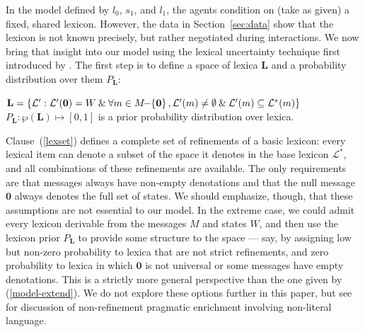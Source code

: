 \documentclass[12pt,twoside]{article}
\newcommand{\secref}[1]{Section~\ref{#1}}
\newcommand{\eg}[1]{(\ref{#1})}
\newcommand{\subeg}[2]{(\ref{#2})}
\newcommand{\set}[1]{\ensuremath{\left\{ #1 \right\}}}
\newcommand{\States}{W}
\newcommand{\Lex}{\mathcal{L}}
\newcommand{\LexStar}{\Lex^{\ast}}
\newcommand{\LexSet}{\mathbf{L}}
\newcommand{\Messages}{M}
\newcommand{\msg}{m}
\newcommand{\LexPrior}{P_{\LexSet}}
\newcommand{\listenerZero}{l_{0}}
\newcommand{\speakerOne}{s_{1}}
\newcommand{\listenerOne}{l_{1}}
\newcommand{\nullmsg}{\mathbf{0}}
\renewcommand{\_}{\textbf{\textunderscore\hspace{-4pt}\textunderscore\hspace{-3pt}\textunderscore\hspace{-4pt}\textunderscore}\hspace{0.5pt}}			%
\begin{document}
In the model defined by $\listenerZero$, $\speakerOne$, and
$\listenerOne$, the agents condition on (take as given) a fixed,
shared lexicon. However, the data in \secref{sec:data} show that the
lexicon is not known precisely, but rather negotiated during
interactions. We now bring that insight into our model using the
lexical uncertainty technique first introduced by
\citet{Bergen:Goodman:Levy:2012,bergen-levy-goodman:2014}. The first
step is to define a space of lexica $\LexSet$ and a probability
distribution over them $\LexPrior$:
%
\begin{exe}
\ex\label{model-extend}
  \begin{xlist} 
  \ex\label{lexset}%
      $\LexSet = 
      \set{\Lex' : 
        \Lex'(\nullmsg) = \States \mathbin{\&}
        \forall \msg \in \Messages{\negthinspace-\negthinspace}\set{\nullmsg}, 
        \Lex'(\msg) \neq \emptyset \mathbin{\&}
        \Lex'(\msg) \subseteq \LexStar(\msg)}$
  \ex\label{LexPrior}%
    $\LexPrior : \wp(\LexSet) \mapsto [0,1]$ is a prior
    probability distribution over lexica.  
  \end{xlist}
\end{exe}
%
Clause~\subeg{model-extend}{lexset} defines a complete set of
refinements of a basic lexicon: every lexical item can denote a subset
of the space it denotes in the base lexicon $\LexStar$, and all
combinations of these refinements are available. The only requirements
are that messages always have non-empty denotations and that the null
message $\nullmsg$ always denotes the full set of states. 
We should emphasize, though, that these
assumptions are not essential to our model. In the extreme case, we
could admit every lexicon derivable from the messages $\Messages$ and
states $\States$, and then use the lexicon prior $\LexPrior$ to
provide some structure to the space --- say, by assigning low but
non-zero probability to lexica that are not strict refinements, and
zero probability to lexica in which $\nullmsg$ is not universal or
some messages have empty denotations. This is a strictly more general
perspective than the one given by \eg{model-extend}. We do not explore
these options further in this paper, but see
\citealt{Kao:Bergen:Goodman:2014,Kao-etal:2014} for discussion of
non-refinement pragmatic enrichment involving non-literal language.
\end{document}
